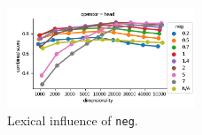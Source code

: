 \begin{figure}[h]
  \centering

  \includegraphics[width=0.5\textwidth]{supplement/figures/lexical-interaction-neg}

  \caption{Lexical influence of \texttt{neg}.}
  \label{fig:lexical-neg}
\end{figure}
